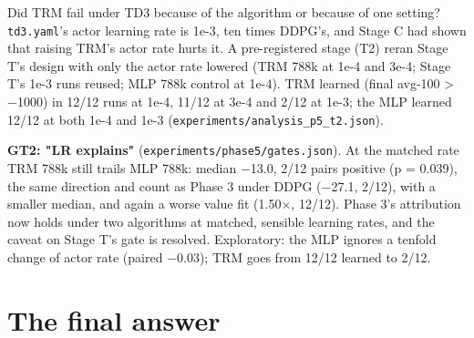 \documentclass[11pt]{article}
\begin{document}
Did TRM fail under TD3 because of the algorithm or because of one setting? \texttt{td3.yaml}'s actor learning rate is 1e-3, ten times DDPG's, and Stage C had shown that raising TRM's actor rate hurts it. A pre-registered stage (T2) reran Stage T's design with only the actor rate lowered (TRM 788k at 1e-4 and 3e-4; Stage T's 1e-3 runs reused; MLP 788k control at 1e-4). TRM learned (final avg-100 > $-$1000) in 12/12 runs at 1e-4, 11/12 at 3e-4 and 2/12 at 1e-3; the MLP learned 12/12 at both 1e-4 and 1e-3 (\texttt{experiments/\allowbreak{}analysis\_\allowbreak{}p5\_\allowbreak{}t2.\allowbreak{}json}).



\textbf{GT2: "LR explains"} (\texttt{experiments/\allowbreak{}phase5/\allowbreak{}gates.\allowbreak{}json}). At the matched rate TRM 788k still trails MLP 788k: median $-$13.0, 2/12 pairs positive (p = 0.039), the same direction and count as Phase 3 under DDPG ($-$27.1, 2/12), with a smaller median, and again a worse value fit (1.50$\times$, 12/12). Phase 3's attribution now holds under two algorithms at matched, sensible learning rates, and the caveat on Stage T's gate is resolved. Exploratory: the MLP ignores a tenfold change of actor rate (paired $-$0.03); TRM goes from 12/12 learned to 2/12.



\medskip



\section*{The final answer}
\end{document}

